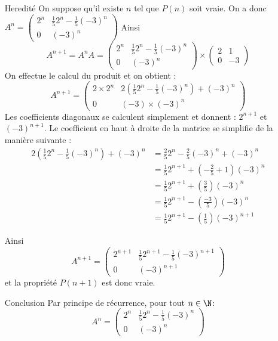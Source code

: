 \documentclass[a4paper, 11pt,reqno]{article}
\begin{document}
\begin{correction}
\begin{itemize}
\item[Heredité] 
On suppose qu'il existe $n$ tel que $P(n)$ soit vraie. On a donc 
$A^n =\left(\begin{array}{rc} 2^n&\frac{1}{5}2^n - \frac{1}{5}(-3)^n\\0&(-3)^n \end{array}\right) $
Ainsi 
$$A^{n+1} = A^n A  =\left(\begin{array}{rc} 2^n&\frac{1}{5}2^n - \frac{1}{5}(-3)^n\\0&(-3)^n \end{array}\right) \times  \left(\begin{array}{rr} 2&1\\0&-3 \end{array}\right)$$
On effectue le calcul du produit et on obtient :
$$A^{n+1} =
\left(\begin{array}{rc} 2\times 2^n&2(\frac{1}{5}2^n - \frac{1}{5}(-3)^n)  +(-3)^n\\0&(-3)\times (-3)^n \end{array}\right)$$
Les coefficients diagonaux se calculent simplement et donnent : $2^{n+1}$ et $(-3)^{n+1}$. 
Le coefficient en haut à droite de la matrice se simplifie de la manière suivante : 
\begin{align*}
2(\frac{1}{5}2^n - \frac{1}{5}(-3)^n)  +(-3)^n &=\frac{2}{5}2^n -\frac{2}{5}(-3)^n+(-3)^n\\
																	&= \frac{1}{5}2^{n+1} +(-\frac{2}{5}+1)(-3)^n\\
																	&= \frac{1}{5}2^{n+1} +(\frac{3}{5})(-3)^n\\
																	&= \frac{1}{5}2^{n+1} -(\frac{-3}{5})(-3)^n\\																									&= \frac{1}{5}2^{n+1} -(\frac{1}{5})(-3)^{n+1}
\end{align*}

Ainsi 
$$A^{n+1} = \left(\begin{array}{rc} 2^{n+1}&\frac{1}{5}2^{n+1} - \frac{1}{5}(-3)^{n+1}\\0&(-3)^{n+1} \end{array}\right) $$
et la propriété $P(n+1)$ est donc vraie. 
\item[Conclusion]
Par principe de récurrence, pour tout $n\in \N$: 
$$A^n = \left(\begin{array}{rc} 2^n&\frac{1}{5}2^n - \frac{1}{5}(-3)^n\\0&(-3)^n \end{array}\right) $$






\end{itemize}

\end{correction}
\end{document}
